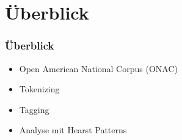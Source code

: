 \section{Überblick}
\label{sec:ueberblick}

\begin{frame}
  \frametitle{Überblick}

  \begin{itemize}
  \item Open American National Corpus (ONAC)
  \item Tokenizing
  \item Tagging
  \item Analyse mit Hearst Patterns
  \end{itemize}
\end{frame}
